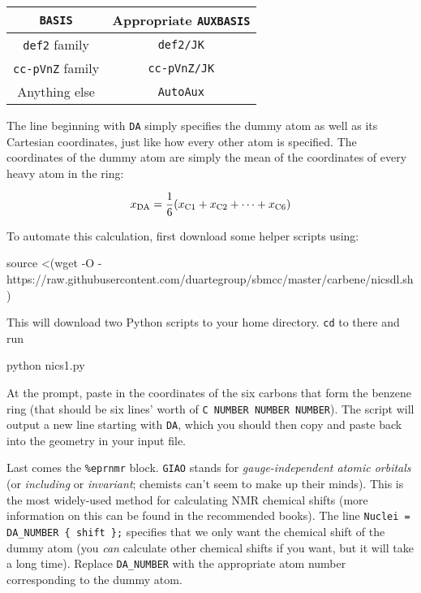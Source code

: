 \documentclass[10pt]{article}
\begin{document}
\begin{center}
    \begin{tabular}{cc}
        \toprule
        \texttt{BASIS} & Appropriate \texttt{AUXBASIS} \\ \midrule
        \texttt{def2} family & \texttt{def2/JK} \\
        \texttt{cc-pVnZ} family & \texttt{cc-pVnZ/JK} \\
        Anything else & \texttt{AutoAux} \\
        \bottomrule
    \end{tabular}
\end{center}

The line beginning with \texttt{DA} simply specifies the dummy atom as well as its Cartesian coordinates, just like how every other atom is specified. The coordinates of the dummy atom are simply the mean of the coordinates of every heavy atom in the ring:

\[ x_{\ce{DA}} = \frac{1}{6}(x_{\ce{C}1} + x_{\ce{C}2} + \cdots + x_{\ce{C}6}) \]

To automate this calculation, first download some helper scripts using:

\begin{cmdline}
source <(wget -O - https://raw.githubusercontent.com/duartegroup/sbmcc/master/carbene/nicsdl.sh)
\end{cmdline}

This will download two Python scripts to your home directory. \texttt{cd} to there and run

\begin{cmdline}
python nics1.py
\end{cmdline}

At the prompt, paste in the coordinates of the six carbons that form the benzene ring (that should be six lines' worth of \texttt{C   NUMBER   NUMBER   NUMBER}). The script will output a new line starting with \texttt{DA}, which you should then copy and paste back into the geometry in your input file.

Last comes the \texttt{\%eprnmr} block. \texttt{GIAO} stands for \textit{gauge-independent atomic orbitals} (or \textit{including} or \textit{invariant}; chemists can't seem to make up their minds). This is the most widely-used method for calculating NMR chemical shifts (more information on this can be found in the recommended books). The line \texttt{Nuclei = DA\_NUMBER \{ shift \};} specifies that we only want the chemical shift of the dummy atom (you \textit{can} calculate other chemical shifts if you want, but it will take a long time). Replace \texttt{DA\_NUMBER} with the appropriate atom number corresponding to the dummy atom.
\end{document}

